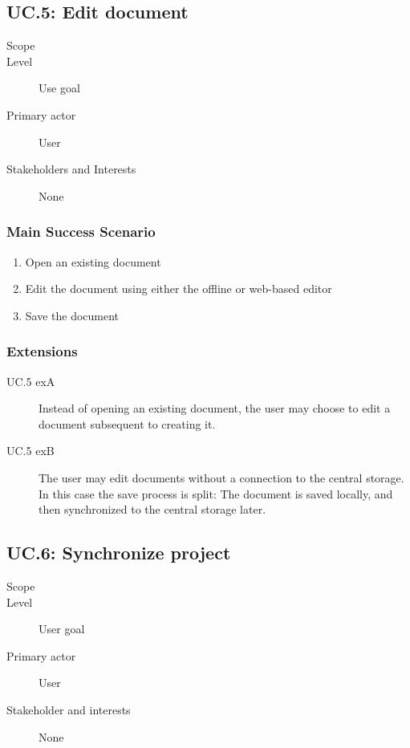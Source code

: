 \subsection{UC.5: Edit document}
\begin{description}
    \item[Scope] \SOP{}
    \item[Level] Use goal
    \item[Primary actor] User
    \item[Stakeholders and Interests] None
\end{description}

\subsubsection{Main Success Scenario}
\begin{enumerate}
    \item Open an existing document
    \item Edit the document using either the offline or web-based \SOP{} editor
    \item Save the document
\end{enumerate}
    
\subsubsection{Extensions}
\begin{description}
    \item[UC.5 exA] Instead of opening an existing document, the user may choose to edit a document subsequent to creating it.
    \item[UC.5 exB] The user may edit documents without a connection to the central storage. In this case the save process is split: The document is saved locally, and then synchronized to the central storage later.
\end{description}

\subsection{UC.6: Synchronize project}
\begin{description}
    \item[Scope] \SOP{}
    \item[Level] User goal
    \item[Primary actor] User
    \item[Stakeholder and interests] None
\end{description}
    
